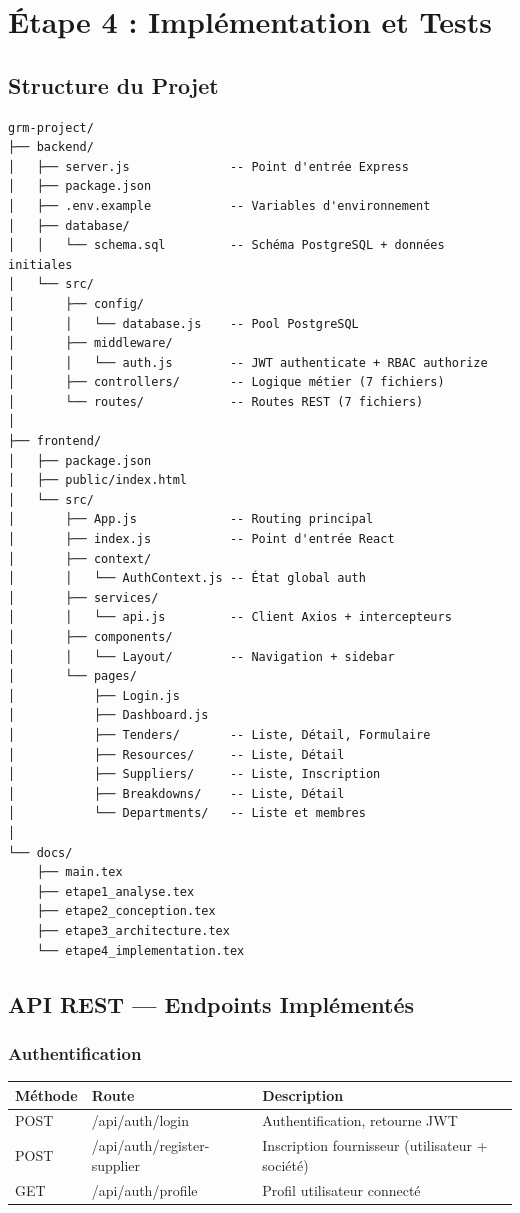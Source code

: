 \chapter{Étape 4 : Implémentation et Tests}

\section{Structure du Projet}

\begin{verbatim}
grm-project/
├── backend/
│   ├── server.js              -- Point d'entrée Express
│   ├── package.json
│   ├── .env.example           -- Variables d'environnement
│   ├── database/
│   │   └── schema.sql         -- Schéma PostgreSQL + données initiales
│   └── src/
│       ├── config/
│       │   └── database.js    -- Pool PostgreSQL
│       ├── middleware/
│       │   └── auth.js        -- JWT authenticate + RBAC authorize
│       ├── controllers/       -- Logique métier (7 fichiers)
│       └── routes/            -- Routes REST (7 fichiers)
│
├── frontend/
│   ├── package.json
│   ├── public/index.html
│   └── src/
│       ├── App.js             -- Routing principal
│       ├── index.js           -- Point d'entrée React
│       ├── context/
│       │   └── AuthContext.js -- État global auth
│       ├── services/
│       │   └── api.js         -- Client Axios + intercepteurs
│       ├── components/
│       │   └── Layout/        -- Navigation + sidebar
│       └── pages/
│           ├── Login.js
│           ├── Dashboard.js
│           ├── Tenders/       -- Liste, Détail, Formulaire
│           ├── Resources/     -- Liste, Détail
│           ├── Suppliers/     -- Liste, Inscription
│           ├── Breakdowns/    -- Liste, Détail
│           └── Departments/   -- Liste et membres
│
└── docs/
    ├── main.tex
    ├── etape1_analyse.tex
    ├── etape2_conception.tex
    ├── etape3_architecture.tex
    └── etape4_implementation.tex
\end{verbatim}

\section{API REST — Endpoints Implémentés}

\subsection{Authentification}

\begin{table}[h!]
\centering
\begin{tabularx}{\textwidth}{|l|l|X|}
\hline
\textbf{Méthode} & \textbf{Route} & \textbf{Description} \\
\hline
POST & /api/auth/login & Authentification, retourne JWT \\
\hline
POST & /api/auth/register-supplier & Inscription fournisseur (utilisateur + société) \\
\hline
GET & /api/auth/profile & Profil utilisateur connecté \\
\hline
\end{tabularx}
\end{table}

